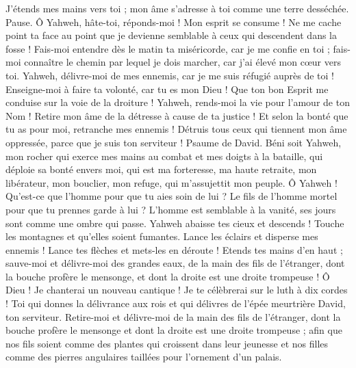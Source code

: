 \begin{multicols}{2}
J'étends mes mains vers toi ; mon âme s'adresse à toi comme une terre desséchée. Pause.
Ô Yahweh, hâte-toi, réponds-moi ! Mon esprit se consume ! Ne me cache point ta face au point que je devienne semblable à ceux qui descendent dans la fosse !
Fais-moi entendre dès le matin ta miséricorde, car je me confie en toi ; fais-moi connaître le chemin par lequel je dois marcher, car j'ai élevé mon cœur vers toi.
Yahweh, délivre-moi de mes ennemis, car je me suis réfugié auprès de toi !
Enseigne-moi à faire ta volonté, car tu es mon Dieu ! Que ton bon Esprit me conduise sur la voie de la droiture !
Yahweh, rends-moi la vie pour l'amour de ton Nom ! Retire mon âme de la détresse à cause de ta justice !
Et selon la bonté que tu as pour moi, retranche mes ennemis ! Détruis tous ceux qui tiennent mon âme oppressée, parce que je suis ton serviteur !
\VerseOne{}Psaume de David. Béni soit Yahweh, mon rocher qui exerce mes mains au combat et mes doigts à la bataille,
qui déploie sa bonté envers moi, qui est ma forteresse, ma haute retraite, mon libérateur, mon bouclier, mon refuge, qui m’assujettit mon peuple.
Ô Yahweh ! Qu’est-ce que l'homme pour que tu aies soin de lui ? Le fils de l'homme mortel pour que tu prennes garde à lui ?
L'homme est semblable à la vanité, ses jours sont comme une ombre qui passe.
Yahweh abaisse tes cieux et descends ! Touche les montagnes et qu'elles soient fumantes.
Lance les éclairs et disperse mes ennemis ! Lance tes flèches et mets-les en déroute !
Etends tes mains d'en haut ; sauve-moi et délivre-moi des grandes eaux, de la main des fils de l'étranger,
dont la bouche profère le mensonge, et dont la droite est une droite trompeuse !
Ô Dieu ! Je chanterai un nouveau cantique ! Je te célèbrerai sur le luth à dix cordes !
Toi qui donnes la délivrance aux rois et qui délivres de l'épée meurtrière David, ton serviteur.
Retire-moi et délivre-moi de la main des fils de l'étranger, dont la bouche profère le mensonge et dont la droite est une droite trompeuse ;
afin que nos fils soient comme des plantes qui croissent dans leur jeunesse et nos filles comme des pierres angulaires taillées pour l'ornement d'un palais.

\end{multicols}
